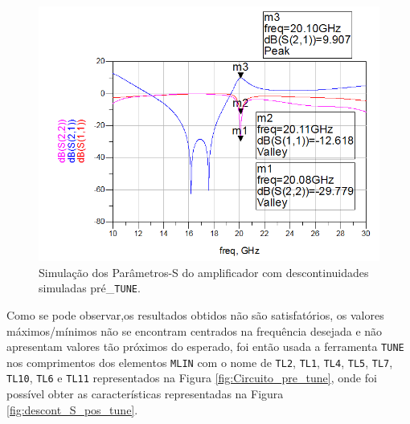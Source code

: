 \documentclass[11pt]{article}
\numberwithin{equation}{section}
\begin{document}
\begin{figure}[H]
	\centering
	\includegraphics[keepaspectratio=true, scale=0.45]{exps/descont_S_pre_tune}
	\vspace{-0.5em}
	\caption{Simulação dos Parâmetros-S do amplificador com descontinuidades simuladas pré\_\texttt{TUNE}.}
	\vspace{-0.8em}
	\label{fig:descont_S_pre_tune}
\end{figure}

Como se pode observar,os resultados obtidos não são satisfatórios, os valores máximos/mínimos não se encontram centrados na frequência desejada e não apresentam valores tão próximos do esperado, foi então usada a ferramenta \texttt{TUNE} nos comprimentos dos elementos \texttt{MLIN} com o nome de \texttt{TL2}, \texttt{TL1}, \texttt{TL4}, \texttt{TL5}, \texttt{TL7}, \texttt{TL10}, \texttt{TL6} e \texttt{TL11} representados na Figura \ref{fig:Circuito_pre_tune}, onde foi possível obter as características representadas na Figura \ref{fig:descont_S_pos_tune}.
\end{document}
